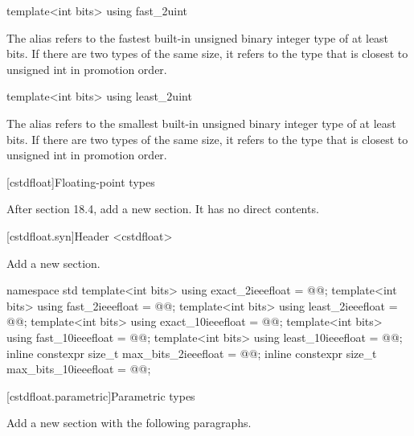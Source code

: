 \begin{addedblock}
\begin{itemdecl}
template<int bits> using fast_2uint
\end{itemdecl}

\begin{itemdescr}
The alias  refers to the fastest built-in unsigned binary integer type of at least  bits. If there are two types of the same size, it refers to the type that is closest to unsigned int in promotion order.
\end{itemdescr}

\begin{itemdecl}
template<int bits> using least_2uint
\end{itemdecl}

\begin{itemdescr}
The alias  refers to the smallest built-in unsigned binary integer type of at least  bits. If there are two types of the same size, it refers to the type that is closest to unsigned int in promotion order.
\end{itemdescr}
\end{addedblock}

[cstdfloat]{Floating-point types}

After section 18.4, add a new section. It has no direct contents.

[cstdfloat.syn]{Header <cstdfloat>}

Add a new section.

\begin{addedblock}
    \begin{codeblock}
namespace std {
  template<int bits> using exact_2ieeefloat = @\impdefx{}@;
  template<int bits> using fast_2ieeefloat = @\impdefx{}@;
  template<int bits> using least_2ieeefloat = @\impdefx{}@;
  template<int bits> using exact_10ieeefloat = @\impdefx{}@;
  template<int bits> using fast_10ieeefloat = @\impdefx{}@;
  template<int bits> using least_10ieeefloat = @\impdefx{}@;
}
inline constexpr size_t max_bits_2ieeefloat = @\impdefx{}@;
inline constexpr size_t max_bits_10ieeefloat = @\impdefx{}@;
    \end{codeblock}
\end{addedblock}

[cstdfloat.parametric]{Parametric types}

Add a new section with the following paragraphs.

